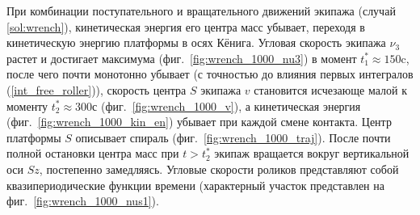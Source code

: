 При комбинации поступательного и вращательного движений экипажа (случай \ref{sol:wrench}), кинетическая энергия его центра масс убывает, переходя в кинетическую энергию платформы в осях Кёнига.
Угловая скорость экипажа $\nu_3$ растет и достигает максимума (фиг.~\ref{fig:wrench_1000_nu3}) в момент $t^*_1 \approx 150$c, после чего почти монотонно убывает (с точностью до влияния первых интегралов (\ref{int_free_roller})), скорость центра $S$ экипажа $v$ становится исчезающе малой к моменту $t^*_2 \approx 300$с (фиг.~\ref{fig:wrench_1000_v}), а кинетическая энергия (фиг.~\ref{fig:wrench_1000_kin_en}) убывает при каждой смене контакта. Центр платформы $S$ описывает спираль (фиг.~\ref{fig:wrench_1000_traj}). После почти полной остановки центра масс при  $t > t^*_2$ экипаж вращается вокруг вертикальной оси $Sz$, постепенно замедляясь. Угловые скорости роликов представляют собой квазипериодические функции времени (характерный участок представлен на фиг.~\ref{fig:wrench_1000_nus1}).

\newpage


